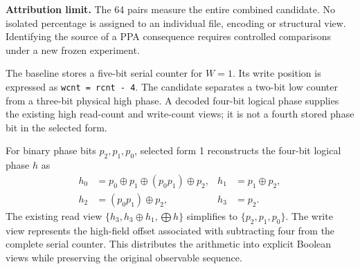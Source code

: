 \begin{scopebox}\textbf{Attribution limit.} The 64 pairs measure the entire combined candidate. No isolated percentage is assigned to an individual file, encoding or structural view. Identifying the source of a PPA consequence requires controlled comparisons under a new frozen experiment.\end{scopebox}

The baseline stores a five-bit serial counter for $W=1$. Its write position is expressed as \texttt{wcnt = rcnt - 4}. The candidate separates a two-bit low counter from a three-bit physical high phase. A decoded four-bit logical phase supplies the existing high read-count and write-count views; it is not a fourth stored phase bit in the selected form.

\begin{center}\end{center}

For binary phase bits $p_2,p_1,p_0$, selected form 1 reconstructs the four-bit logical phase $h$ as
\[
\begin{aligned}
h_0&=p_0\oplus p_1\oplus(p_0p_1)\oplus p_2,& h_1&=p_1\oplus p_2,\\
h_2&=(p_0p_1)\oplus p_2,& h_3&=p_2.
\end{aligned}
\]
The existing read view $\{h_3,h_3\oplus h_1,\bigoplus h\}$ simplifies to $\{p_2,p_1,p_0\}$. The write view represents the high-field offset associated with subtracting four from the complete serial counter. This distributes the arithmetic into explicit Boolean views while preserving the original observable sequence.

